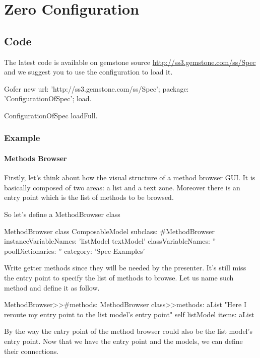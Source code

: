 \documentclass[a4paper,10pt,twoside]{book}
\begin{document}
\fi
\sloppy

\chapter{Zero Configuration}



\section{Code}

The latest code is available on gemstone source \url{http://ss3.gemstone.com/ss/Spec} and we suggest you to use the configuration to load it.

\begin{code}{}
Gofer new
	url: 'http://ss3.gemstone.com/ss/Spec';
	package: 'ConfigurationOfSpec';
	load.
	
ConfigurationOfSpec loadFull.	
\end{code}

\subsection{Example}

\subsubsection{Methods Browser}

Firstly, let's think about how the visual structure of a method browser GUI. It is basically composed of two areas: a list and a text zone. Moreover there is an entry point which is the list of methods to be browsed.

So let's define a MethodBrowser class

\begin{classdef}{MethodBrowser class}
ComposableModel subclass: #MethodBrowser
	instanceVariableNames: 'listModel textModel'
	classVariableNames: ''
	poolDictionaries: ''
	category: 'Spec-Examples'
\end{classdef}

Write getter methods since they will be needed by the presenter. It's still miss the entry point to specify the list of methods to browse. Let us name such method  and define it as follow.  

\begin{method}{MethodBrowser>>\#methods:}
MethodBrowser class>>methods: aList
	"Here I reroute my entry point to the list model's entry point"
	self listModel items: aList
\end{method}
By the way the entry point of the method browser could also be the list model's entry point.
Now that we have the entry point and the models, we can define their connections.
\end{document}
